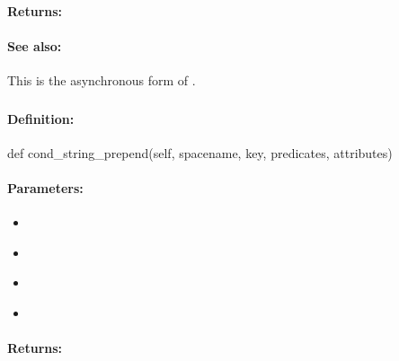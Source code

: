 \paragraph{Returns:}


\paragraph{See also:}  This is the asynchronous form of .

\pagebreak
\subsubsection{}
\label{api:python:cond_string_prepend}


\paragraph{Definition:}
\begin{pythoncode}
def cond_string_prepend(self, spacename, key, predicates, attributes)
\end{pythoncode}

\paragraph{Parameters:}
\begin{itemize}[noitemsep]
\item {}\\

\item {}\\

\item {}\\

\item {}\\

\end{itemize}

\paragraph{Returns:}


